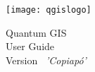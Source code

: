 
\begin{titlepage}
\begin{center}

\begin{center}
\texttt{[image: qgislogo]} 
\end{center}

\Huge{Quantum GIS}\\
\vspace{0.5cm}
\Large{User Guide} \\
\vspace{0.5cm}
\Large{Version ~\CURRENT \textsl{'Copiapó'}}

\end{center}
\end{titlepage}
